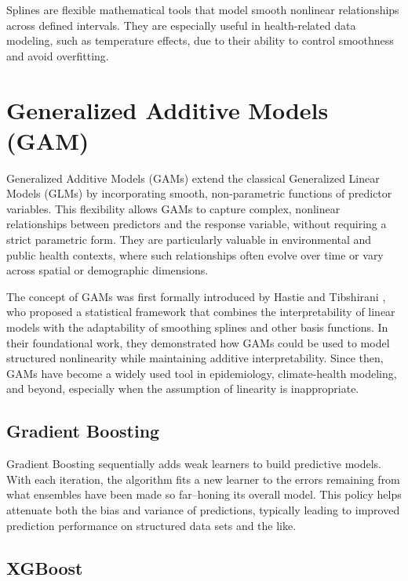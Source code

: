 \documentclass[
]{krantz}
\begin{document}
Splines are flexible mathematical tools that model smooth nonlinear relationships across defined intervals. They are especially useful in health-related data modeling, such as temperature effects, due to their ability to control smoothness and avoid overfitting.\citep{hansen2006}

\section{Generalized Additive Models (GAM)}\label{generalized-additive-models-gam}

Generalized Additive Models (GAMs) extend the classical Generalized Linear Models (GLMs) by incorporating smooth, non-parametric functions of predictor variables. This flexibility allows GAMs to capture complex, nonlinear relationships between predictors and the response variable, without requiring a strict parametric form. They are particularly valuable in environmental and public health contexts, where such relationships often evolve over time or vary across spatial or demographic dimensions.

The concept of GAMs was first formally introduced by Hastie and Tibshirani \citep{hastie1986}, who proposed a statistical framework that combines the interpretability of linear models with the adaptability of smoothing splines and other basis functions. In their foundational work, they demonstrated how GAMs could be used to model structured nonlinearity while maintaining additive interpretability. Since then, GAMs have become a widely used tool in epidemiology, climate-health modeling, and beyond, especially when the assumption of linearity is inappropriate.

\subsection{Gradient Boosting}\label{gradient-boosting}

Gradient Boosting sequentially adds weak learners to build predictive models. With each iteration, the algorithm fits a new learner to the errors remaining from what ensembles have been made so far--honing its overall model. This policy helps attenuate both the bias and variance of predictions, typically leading to improved prediction performance on structured data sets and the like.

\subsection{XGBoost}\label{xgboost}
\end{document}
